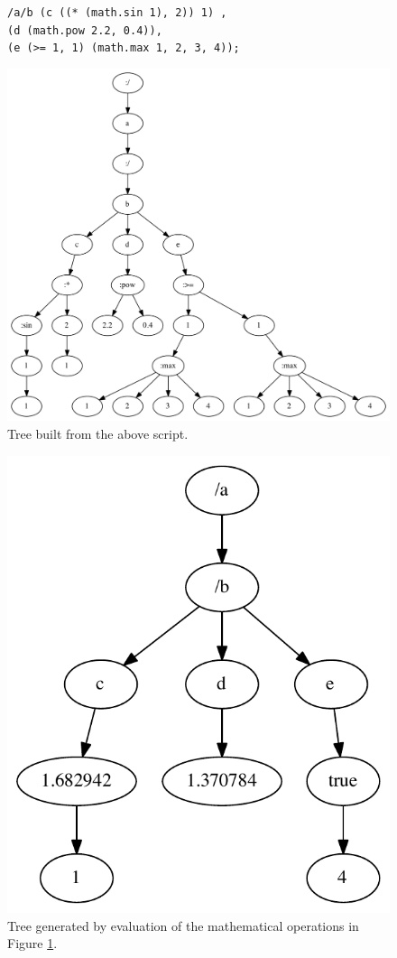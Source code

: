 \documentclass{article}
\newcommand{\code}	[2][0.9]		{\vspace{0mm}\begin{center}\colorbox{mygrey}{
							\begin{minipage}[t]{#1\columnwidth} 
							{\small \texttt{#2}}
							\end{minipage}}\end{center}}
\newcommand{\ulb}		{\hspace*{4mm}}
\begin{document}
\begin{figure}[htbp]
\code{/a/b 	(c ((* (math.sin 1), 2)) 1) ,\\
\ulb		(d (math.pow 2.2, 0.4)),\\
\ulb		(e (>= 1, 1) (math.max 1, 2, 3, 4));}
\begin{center}
\includegraphics[width=0.72\columnwidth]{tree/sample3}
\caption{Tree built from the above script.}
\label{parsesample2}
\end{center}
\end{figure}

\begin{figure}[htbp]
\begin{center}
\includegraphics[width=0.5\columnwidth]{eval/sample3}
\caption{Tree generated by evaluation of the mathematical operations in Figure \ref{parsesample2}.}
\label{treesample2}
\end{center}
\end{figure}
\end{document}
